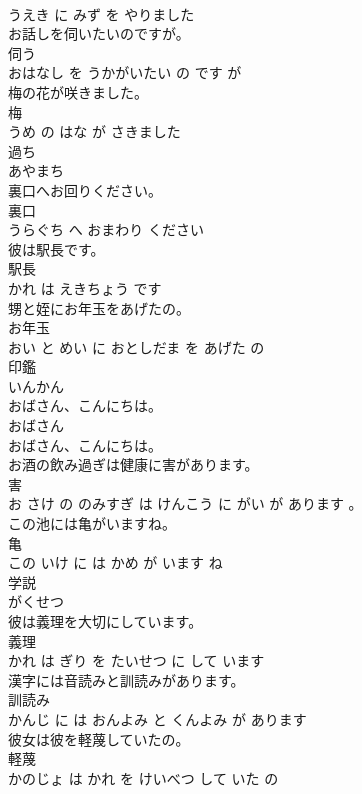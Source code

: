 \documentclass[8pt]{extreport}
\begin{document}
\begin{CJK}{UTF8}{min}
\\	うえき に みず を やりました			
\\	お話しを伺いたいのですが。	
\\	伺う 
\\	おはなし を うかがいたい の です が			
\\	梅の花が咲きました。	
\\	梅 
\\	うめ の はな が さきました			
\\	過ち	
\\	あやまち			
\\	裏口へお回りください。	
\\	裏口 
\\	うらぐち へ おまわり ください			
\\	彼は駅長です。	
\\	駅長 
\\	かれ は えきちょう です			
\\	甥と姪にお年玉をあげたの。	
\\	お年玉 
\\	おい と めい に おとしだま を あげた の			
\\	印鑑	
\\	いんかん			
\\	おばさん、こんにちは。	
\\	おばさん 
\\	おばさん、こんにちは。			
\\	お酒の飲み過ぎは健康に害があります。	
\\	害 
\\	お さけ の のみすぎ は けんこう に がい が あります 。			
\\	この池には亀がいますね。	
\\	亀 
\\	この いけ に は かめ が います ね			
\\	学説	
\\	がくせつ			
\\	彼は義理を大切にしています。	
\\	義理 
\\	かれ は ぎり を たいせつ に して います			
\\	漢字には音読みと訓読みがあります。	
\\	訓読み 
\\	かんじ に は おんよみ と くんよみ が あります			
\\	彼女は彼を軽蔑していたの。	
\\	軽蔑 
\\	かのじょ は かれ を けいべつ して いた の			

\end{CJK}
\end{document}
